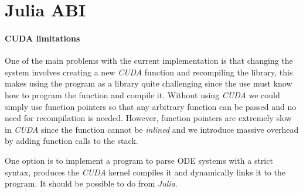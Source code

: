 
\section{Julia ABI}%
\label{sec:abi}

\paragraph{CUDA limitations}

One of the main problems with the current implementation is that changing the system
involves creating a new \emph{CUDA} function and recompiling the library, this makes
using the program as a library quite challenging since the use must know how to
program the function and compile it. Without using \emph{CUDA} we could simply
use function pointers so that any arbitrary function can be passed and no need
for recompilation is needed. However, function pointers are extremely slow in \emph{CUDA}
since the function cannot be \emph{inlined} and we introduce massive overhead by
adding function calls to the stack.

One option is to implement a program to parse ODE systems with a strict syntax,
produces the \emph{CUDA} kernel compiles it and dynamically links it to the
program. It should be possible to do from \emph{Julia}.
